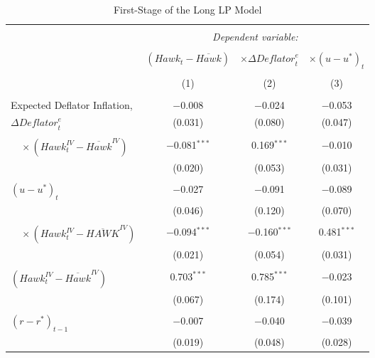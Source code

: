 \documentclass[11pt]{article}
\begin{document}
    \begin{table}[!htbp] \centering \scriptsize 
      \begin{threeparttable}
      \caption{First-Stage of the Long LP Model} 
      \label{tab:fs_long} 
    \begin{tabular}{@{\extracolsep{5pt}}lccc} 
    \\[-1.8ex]\hline 
    \hline \\[-1.8ex] 
    & \multicolumn{3}{c}{\textit{Dependent variable:}} \\ 
    \cline{2-4} 
    \\[-1.8ex] & $\left(\mathit{Hawk}_t-\overline{\mathit{Hawk}}\right)$ &  $\times \Delta\mathit{Deflator}_t^e$ & $\times (u-u^*)_{t}$ \\ 
    \\[-1.8ex] & (1) & (2) & (3)\\ 
    \hline \\[-1.8ex] 
    Expected Deflator Inflation, & $-$0.008 & $-$0.024 & $-$0.053 \\ 
    $\Delta\mathit{Deflator}_t^e$ & (0.031) & (0.080) & (0.047) \\ 
      & & & \\ 
    $\quad \times \left(\mathit{Hawk}_t^\mathit{IV}-\overline{\mathit{Hawk}}^\mathit{IV}\right)$& $-$0.081$^{***}$ & 0.169$^{***}$ & $-$0.010 \\ 
      & (0.020) & (0.053) & (0.031) \\ 
      & & & \\ 
    $(u-u^*)_{t}$ & $-$0.027 & $-$0.091 & $-$0.089 \\ 
    & (0.046) & (0.120) & (0.070) \\ 
    & & & \\ 
    $\quad \times \left(\mathit{Hawk}_t^\mathit{IV}-\overline{\mathit{HAWK}}^\mathit{IV}\right)$& $-$0.094$^{***}$ & $-$0.160$^{***}$ & 0.481$^{***}$ \\ 
    & (0.021) & (0.054) & (0.031) \\ 
    & & & \\ 
    $\left(\mathit{Hawk}_t^\mathit{IV}-\overline{\mathit{Hawk}}^\mathit{IV}\right)$ & 0.703$^{***}$ & 0.785$^{***}$ & $-$0.023 \\ 
    & (0.067) & (0.174) & (0.101) \\ 
    & & & \\ 
    $\left(r-r^*\right)_{t-1}$ & $-$0.007 & $-$0.040 & $-$0.039 \\ 
      & (0.019) & (0.048) & (0.028) \\ 

\end{tabular}
\end{threeparttable}
\end{table}
\end{document}
